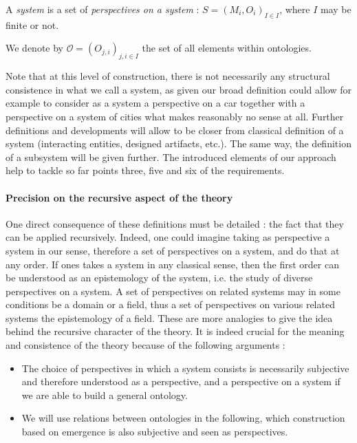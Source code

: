 \begin{definition}
A \emph{system} is a set of \emph{perspectives on a system} : $S = (M_i,O_i)_{I\in I}$, where $I$ may be finite or not.
\end{definition}

We denote by $\mathcal{O} = (O_{j,i})_{j,i\in I}$ the set of all elements within ontologies.

Note that at this level of construction, there is not necessarily any structural consistence in what we call a system, as given our broad definition could allow for example to consider as a system a perspective on a car together with a perspective on a system of cities what makes reasonably no sense at all. Further definitions and developments will allow to be closer from classical definition of a system (interacting entities, designed artifacts, etc.). The same way, the definition of a subsystem will be given further. The introduced elements of our approach help to tackle so far points three, five and six of the requirements.

\paragraph{Precision on the recursive aspect of the theory}

One direct consequence of these definitions must be detailed : the fact that they can be applied recursively. Indeed, one could imagine taking as perspective a system in our sense, therefore a set of perspectives on a system, and do that at any order. If ones takes a system in any classical sense, then the first order can be understood as an epistemology of the system, i.e. the study of diverse perspectives on a system. A set of perspectives on related systems may in some conditions be a domain or a field, thus a set of perspectives on various related systems the epistemology of a field. These are more analogies to give the idea behind the recursive character of the theory. It is indeed crucial for the meaning and consistence of the theory because of the following arguments :
\begin{itemize}
\item The choice of perspectives in which a system consists is necessarily subjective and therefore understood as a perspective, and a perspective on a system if we are able to build a general ontology.
\item We will use relations between ontologies in the following, which construction based on emergence is also subjective and seen as perspectives.
\end{itemize}



